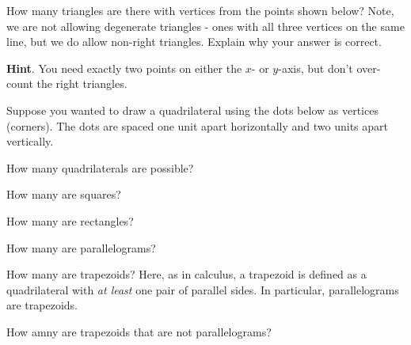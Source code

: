 \documentclass[11pt,]{book}
\theoremstyle{ptxplainnotitle}
\theoremstyle{ptxplaintitle}
\theoremstyle{ptxdefinitionnotitle}
\theoremstyle{ptxdefinitiontitle}
\theoremstyle{ptxdefinitionnotitle}
\theoremstyle{ptxdefinitiontitle}
\theoremstyle{ptxdefinitionnotitle}
\theoremstyle{ptxdefinitiontitle}
\theoremstyle{ptxdefinitiontitlenonumber}
\theoremstyle{ptxdefinitiontitlenonumber}
\numberwithin{equation}{chapter}
\begin{document}
\begin{divisionexercise}{4}\hypertarget{exercise-137}{}
\hypertarget{p-1606}{}%
How many triangles are there with vertices from the points shown below? Note, we are not allowing degenerate triangles - ones with all three vertices on the same line, but we do allow non-right triangles. Explain why your answer is correct.%
\begin{sidebyside}{1}{0.25}{0.25}{0}
\begin{sbspanel}{0.5}
\end{sbspanel}
\end{sidebyside}
\par\smallskip%
\noindent\textbf{Hint}.\hypertarget{hint-12}{}\quad%
\hypertarget{p-1607}{}%
You need exactly two points on either the \(x\)- or \(y\)-axis, but don't over-count the right triangles.%
\end{divisionexercise}%
\begin{divisionexercise}{5}\hypertarget{exercise-138}{}
\hypertarget{p-1611}{}%
Suppose you wanted to draw a quadrilateral using the dots below as vertices (corners).  The dots are spaced one unit apart horizontally and two units apart vertically.%
\begin{sidebyside}{1}{0.23}{0.23}{0}
\begin{sbspanel}{0.54}
\end{sbspanel}
\end{sidebyside}
\par\medskip
\hypertarget{p-1629}{}%
How many quadrilaterals are possible?%
\par
\hypertarget{p-1631}{}%
How many are squares?%
\par
\hypertarget{p-1633}{}%
How many are rectangles?%
\par
\hypertarget{p-1635}{}%
How many are parallelograms?%
\par
\hypertarget{p-1637}{}%
How many are trapezoids?  Here, as in calculus, a trapezoid is defined as a quadrilateral with \emph{at least} one pair of parallel sides. In particular, parallelograms are trapezoids.%
\par
\hypertarget{p-1639}{}%
How amny are trapezoids that are not parallelograms?%
\end{divisionexercise}%
\end{document}
